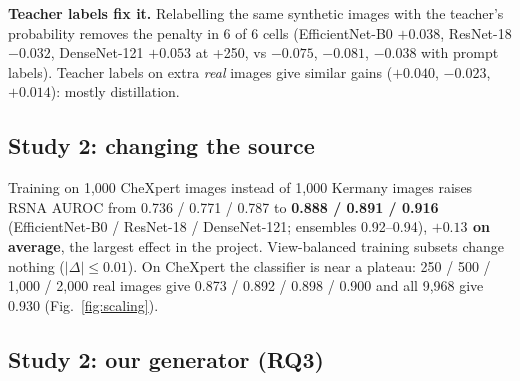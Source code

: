 \documentclass[11pt,a4paper]{article}
\begin{document}
\textbf{Teacher labels fix it.} Relabelling the same synthetic images with the teacher's probability removes the penalty in 6 of 6 cells (EfficientNet-B0 $+0.038$, ResNet-18 $-0.032$, DenseNet-121 $+0.053$ at +250, vs $-0.075$, $-0.081$, $-0.038$ with prompt labels). Teacher labels on extra \emph{real} images give similar gains ($+0.040$, $-0.023$, $+0.014$): mostly distillation.

\subsection{Study 2: changing the source}
Training on 1{,}000 CheXpert images instead of 1{,}000 Kermany images raises RSNA AUROC from 0.736 / 0.771 / 0.787 to \textbf{0.888 / 0.891 / 0.916} (EfficientNet-B0 / ResNet-18 / DenseNet-121; ensembles 0.92--0.94), \textbf{$+0.13$ on average}, the largest effect in the project. View-balanced training subsets change nothing ($|\Delta|\le0.01$). On CheXpert the classifier is near a plateau: 250 / 500 / 1{,}000 / 2{,}000 real images give 0.873 / 0.892 / 0.898 / 0.900 and all 9{,}968 give 0.930 (Fig.~\ref{fig:scaling}).

\subsection{Study 2: our generator (RQ3)}\label{sec:gen}
\begin{table}[h]\centering\small
{}
\caption{Generator versions (2{,}000 images; synthetic-only rows from v2 on use synthetic validation). Mean of 3 architectures $\times$ 3 seeds.}\label{tab:gen}
\end{table}
\end{document}
